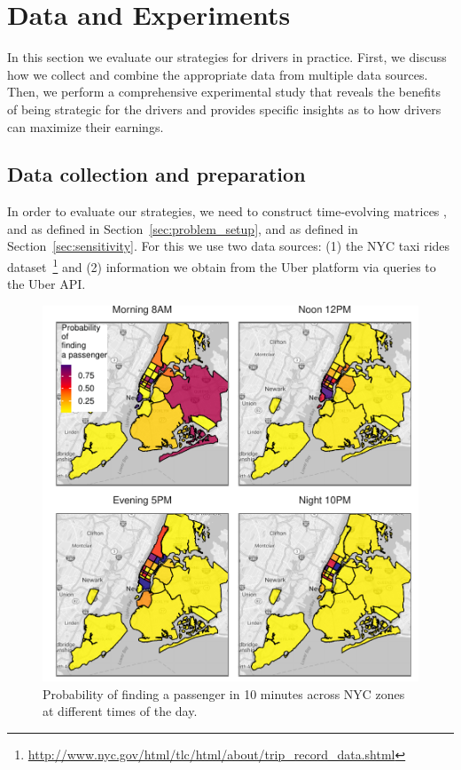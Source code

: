 
\section{Data and Experiments}
\label{sec:experiments}
In this section we  evaluate our strategies for drivers 
in practice. First, we discuss how we collect and combine the appropriate data 
from multiple data sources. Then, we perform a comprehensive experimental study
that reveals the benefits of being strategic for the drivers and provides
specific insights as to how drivers can maximize their earnings.

\subsection{Data collection and preparation}
In order to evaluate our strategies, we need to construct 
time-evolving matrices 
{\empiricaltransitionmatrix}, {\traveltimematrix} and {\rewardsmatrix} as defined in Section~\ref{sec:problem_setup},
and {\countmatrix} as defined in Section~\ref{sec:sensitivity}.
For this we use two data sources: (1) the NYC taxi rides 
dataset~\footnote{\url{http://www.nyc.gov/html/tlc/html/about/trip_record_data.shtml}} and
(2) information we obtain from the Uber platform via queries to the Uber API.

\begin{figure}
	\centering
	\includegraphics{figures/successful_heatmap.pdf}
	\caption{Probability of finding a passenger in 10 minutes across NYC zones at different times of the day.}
	\label{fig:successful_heatmap}
\end{figure}


